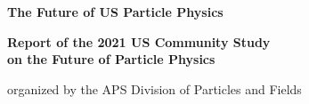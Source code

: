 \documentclass{tcibook}
\begin{document}




\parindent=0pt
\parskip=8pt
\setlength{\evensidemargin}{0pt}
\setlength{\oddsidemargin}{0pt}
\setlength{\marginparsep}{0.0in}
\setlength{\marginparwidth}{0.0in}
\marginparpush=0pt



\renewcommand{\chapname}{chap:intro_}
\renewcommand{\chapterdir}{.}
\renewcommand{\arraystretch}{1.25}
\addtolength{\arraycolsep}{-3pt}

\thispagestyle{empty}
\begin{centering}
\mbox{\null}
\vfill

{\Huge\bf The Future of US Particle Physics}

\vskip 0.6in

{\LARGE \bf Report of the 2021  US  Community Study  \\
     on the Future of Particle Physics

   
                  \smallskip

       organized by the  APS Division of Particles and Fields}

\vfill





\vfill

\end{centering}

\newpage
\thispagestyle{empty}

\mbox{\null}

\newpage

 

\newpage
\thispagestyle{empty}

\mbox{\null}


\newpage



\newpage
\thispagestyle{empty}

\tableofcontents

\newpage
\end{document}
